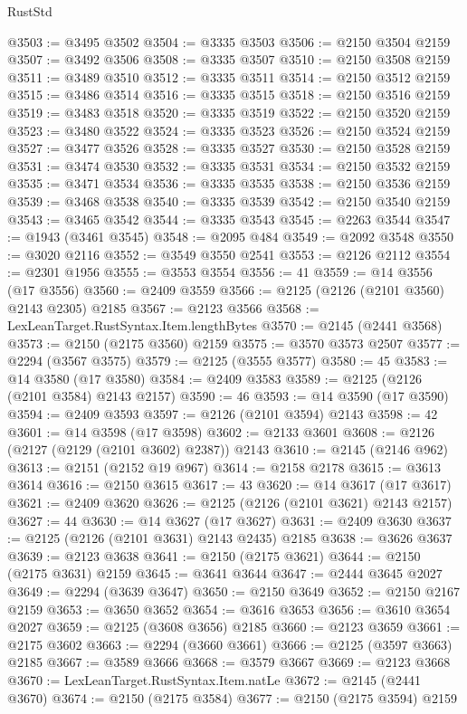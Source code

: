 \begin{lexlean}{RustStd}
\begin{coremodule}
@3503 := @3495 @3502
@3504 := @3335 @3503
@3506 := @2150 @3504 @2159
@3507 := @3492 @3506
@3508 := @3335 @3507
@3510 := @2150 @3508 @2159
@3511 := @3489 @3510
@3512 := @3335 @3511
@3514 := @2150 @3512 @2159
@3515 := @3486 @3514
@3516 := @3335 @3515
@3518 := @2150 @3516 @2159
@3519 := @3483 @3518
@3520 := @3335 @3519
@3522 := @2150 @3520 @2159
@3523 := @3480 @3522
@3524 := @3335 @3523
@3526 := @2150 @3524 @2159
@3527 := @3477 @3526
@3528 := @3335 @3527
@3530 := @2150 @3528 @2159
@3531 := @3474 @3530
@3532 := @3335 @3531
@3534 := @2150 @3532 @2159
@3535 := @3471 @3534
@3536 := @3335 @3535
@3538 := @2150 @3536 @2159
@3539 := @3468 @3538
@3540 := @3335 @3539
@3542 := @2150 @3540 @2159
@3543 := @3465 @3542
@3544 := @3335 @3543
@3545 := @2263 @3544
@3547 := @1943 (@3461 @3545)
@3548 := @2095 @484
@3549 := @2092 @3548
@3550 := @3020 @2116
@3552 := @3549 @3550 @2541
@3553 := @2126 @2112
@3554 := @2301 @1956
@3555 := @3553 @3554
@3556 := 41
@3559 := @14 @3556 (@17 @3556)
@3560 := @2409 @3559
@3566 := @2125 (@2126 (@2101 @3560) @2143 @2305) @2185
@3567 := @2123 @3566
@3568 := LexLeanTarget.RustSyntax.Item.lengthBytes
@3570 := @2145 (@2441 @3568)
@3573 := @2150 (@2175 @3560) @2159
@3575 := @3570 @3573 @2507
@3577 := @2294 (@3567 @3575)
@3579 := @2125 (@3555 @3577)
@3580 := 45
@3583 := @14 @3580 (@17 @3580)
@3584 := @2409 @3583
@3589 := @2125 (@2126 (@2101 @3584) @2143 @2157)
@3590 := 46
@3593 := @14 @3590 (@17 @3590)
@3594 := @2409 @3593
@3597 := @2126 (@2101 @3594) @2143
@3598 := 42
@3601 := @14 @3598 (@17 @3598)
@3602 := @2133 @3601
@3608 := @2126 (@2127 (@2129 (@2101 @3602) @2387)) @2143
@3610 := @2145 (@2146 @962)
@3613 := @2151 (@2152 @19 @967)
@3614 := @2158 @2178
@3615 := @3613 @3614
@3616 := @2150 @3615
@3617 := 43
@3620 := @14 @3617 (@17 @3617)
@3621 := @2409 @3620
@3626 := @2125 (@2126 (@2101 @3621) @2143 @2157)
@3627 := 44
@3630 := @14 @3627 (@17 @3627)
@3631 := @2409 @3630
@3637 := @2125 (@2126 (@2101 @3631) @2143 @2435) @2185
@3638 := @3626 @3637
@3639 := @2123 @3638
@3641 := @2150 (@2175 @3621)
@3644 := @2150 (@2175 @3631) @2159
@3645 := @3641 @3644
@3647 := @2444 @3645 @2027
@3649 := @2294 (@3639 @3647)
@3650 := @2150 @3649
@3652 := @2150 @2167 @2159
@3653 := @3650 @3652
@3654 := @3616 @3653
@3656 := @3610 @3654 @2027
@3659 := @2125 (@3608 @3656) @2185
@3660 := @2123 @3659
@3661 := @2175 @3602
@3663 := @2294 (@3660 @3661)
@3666 := @2125 (@3597 @3663) @2185
@3667 := @3589 @3666
@3668 := @3579 @3667
@3669 := @2123 @3668
@3670 := LexLeanTarget.RustSyntax.Item.natLe
@3672 := @2145 (@2441 @3670)
@3674 := @2150 (@2175 @3584)
@3677 := @2150 (@2175 @3594) @2159

\end{coremodule}
\end{lexlean}
